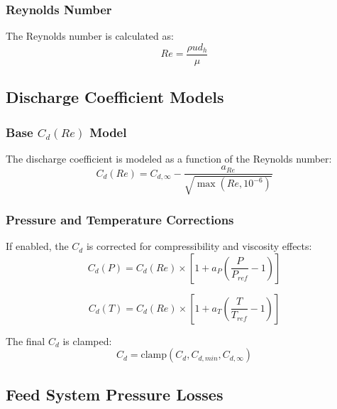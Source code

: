 \subsubsection{Reynolds Number}
The Reynolds number is calculated as:
\begin{equation}
Re = \frac{\rho u d_h}{\mu}
\end{equation}

\subsection{Discharge Coefficient Models}

\subsubsection{Base \(C_d(Re)\) Model}
The discharge coefficient is modeled as a function of the Reynolds number:
\begin{equation}
C_d(Re) = C_{d,\infty} - \frac{a_{Re}}{\sqrt{\max(Re, 10^{-6})}}
\end{equation}

\subsubsection{Pressure and Temperature Corrections}
If enabled, the \(C_d\) is corrected for compressibility and viscosity effects:
\begin{equation}
C_d(P) = C_d(Re) \times \left[1 + a_P \left(\frac{P}{P_{ref}} - 1\right)\right]
\end{equation}

\begin{equation}
C_d(T) = C_d(Re) \times \left[1 + a_T \left(\frac{T}{T_{ref}} - 1\right)\right]
\end{equation}

The final \(C_d\) is clamped:
\begin{equation}
C_d = \text{clamp}(C_d, C_{d,min}, C_{d,\infty})
\end{equation}

\subsection{Feed System Pressure Losses}

